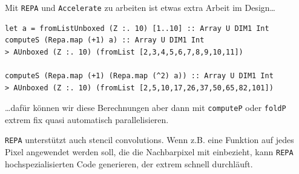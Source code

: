 \documentclass{beamer}
\begin{document}

\begin{frame}[fragile]

Mit \texttt{REPA} und \texttt{Accelerate} zu arbeiten ist etwas extra Arbeit im Design\dots\smallskip\pause

\begin{verbatim}
let a = fromListUnboxed (Z :. 10) [1..10] :: Array U DIM1 Int
computeS (Repa.map (+1) a) :: Array U DIM1 Int
> AUnboxed (Z :. 10) (fromList [2,3,4,5,6,7,8,9,10,11])

computeS (Repa.map (+1) (Repa.map (^2) a)) :: Array U DIM1 Int
> AUnboxed (Z :. 10) (fromList [2,5,10,17,26,37,50,65,82,101])
\end{verbatim}
\pause

\dots dafür können wir diese Berechnungen aber dann mit \texttt{computeP} oder \texttt{foldP} extrem fix quasi automatisch parallelisieren.\pause\bigskip

\texttt{REPA} unterstützt auch \glqq stencil convolutions\grqq . Wenn z.B. eine Funktion auf jedes Pixel angewendet werden soll, die die Nachbarpixel mit einbezieht, kann \texttt{REPA} hochspezialisierten Code generieren, der extrem schnell durchläuft.

\end{frame}

\end{document}
